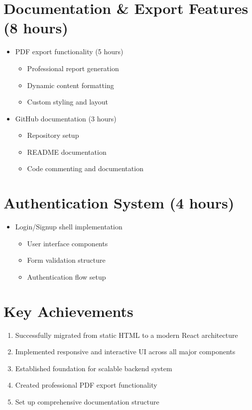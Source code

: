 \documentclass[11pt]{article}
\begin{document}
\section{Documentation \& Export Features (8 hours)}
\begin{itemize}[leftmargin=*]
  \item PDF export functionality (5 hours)
  \begin{itemize}
    \item Professional report generation
    \item Dynamic content formatting
    \item Custom styling and layout
  \end{itemize}
  \item GitHub documentation (3 hours)
  \begin{itemize}
    \item Repository setup
    \item README documentation
    \item Code commenting and documentation
  \end{itemize}
\end{itemize}

\section{Authentication System (4 hours)}
\begin{itemize}[leftmargin=*]
  \item Login/Signup shell implementation
  \begin{itemize}
    \item User interface components
    \item Form validation structure
    \item Authentication flow setup
  \end{itemize}
\end{itemize}

\section{Key Achievements}
\begin{enumerate}[leftmargin=*]
  \item Successfully migrated from static HTML to a modern React architecture
  \item Implemented responsive and interactive UI across all major components
  \item Established foundation for scalable backend system
  \item Created professional PDF export functionality
  \item Set up comprehensive documentation structure
\end{enumerate}
\end{document}
